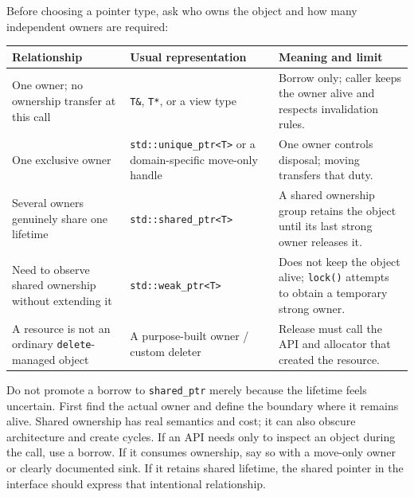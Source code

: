 Before choosing a pointer type, ask who owns the object and how many independent owners are required:

{\def\LTcaptype{none} %
\begin{longtable}[]{@{}
  >{\raggedright\arraybackslash}p{}
  >{\raggedright\arraybackslash}p{}
  >{\raggedright\arraybackslash}p{}@{}}
\toprule\noalign{}
\begin{minipage}[b]{\linewidth}\raggedright
Relationship
\end{minipage} & \begin{minipage}[b]{\linewidth}\raggedright
Usual representation
\end{minipage} & \begin{minipage}[b]{\linewidth}\raggedright
Meaning and limit
\end{minipage} \\
\midrule\noalign{}
\endhead
\bottomrule\noalign{}
\endlastfoot
One owner; no ownership transfer at this call & \texttt{T\&}, \texttt{T*}, or a view type & Borrow only; caller keeps the owner alive and respects invalidation rules. \\
One exclusive owner & \texttt{std::unique\_ptr\textless{}T\textgreater{}} or a domain-specific move-only handle & One owner controls disposal; moving transfers that duty. \\
Several owners genuinely share one lifetime & \texttt{std::shared\_ptr\textless{}T\textgreater{}} & A shared ownership group retains the object until its last strong owner releases it. \\
Need to observe shared ownership without extending it & \texttt{std::weak\_ptr\textless{}T\textgreater{}} & Does not keep the object alive; \texttt{lock()} attempts to obtain a temporary strong owner. \\
A resource is not an ordinary \texttt{delete}-managed object & A purpose-built owner / custom deleter & Release must call the API and allocator that created the resource. \\
\end{longtable}
}

Do not promote a borrow to \texttt{shared\_ptr} merely because the lifetime feels uncertain. First find the actual owner and define the boundary where it remains alive. Shared ownership has real semantics and cost; it can also obscure architecture and create cycles. If an API needs only to inspect an object during the call, use a borrow. If it consumes ownership, say so with a move-only owner or clearly documented sink. If it retains shared lifetime, the shared pointer in the interface should express that intentional relationship.

